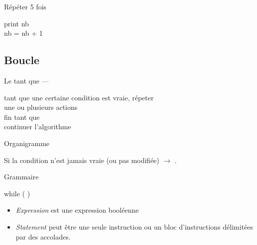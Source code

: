 \begin{hideedit}
\begin{frame}
  \pause
  \begin{block}{Répéter 5 fois}
  \begin{langagenaturel}
    print nb\\
    nb = nb + 1
  \end{langagenaturel}
  \end{block}
\end{frame}

\subsection{Boucle }
\begin{frame}{Le \og tant que \fg --- }
  \begin{langagenaturel}
    tant que une certaine condition est vraie, répeter\\
      \tab une ou plusieurs actions\\
    fin tant que\\
    continuer l'algorithme
  \end{langagenaturel}
\end{frame}

\begin{frame}{Organigramme}

  \pause
  Si la condition n'est jamais vraie (ou pas modifiée) \(\rightarrow\)
  .
\end{frame}

\begin{frame}[fragile]{Grammaire}
  \begin{grammaire}
    while (  )
  \end{grammaire}

  \begin{itemize}
    \item \textit{Expression} est une expression booléenne
    \item \textit{Statement} peut être une seule instruction ou un bloc
      d'instructions délimitées par des accolades.
  \end{itemize}
\end{frame}


\end{hideedit}
